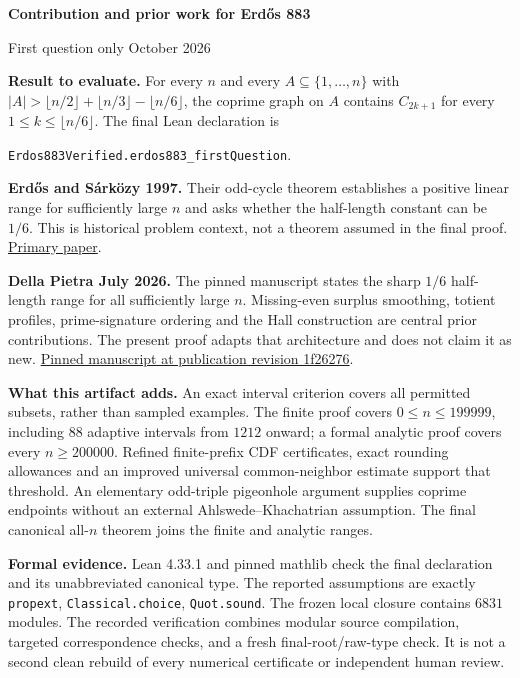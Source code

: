 \documentclass[10pt,letterpaper]{article}
\begin{document}
\begin{center}{\Large\bfseries Contribution and prior work for Erdős 883\par}\vspace{5pt}First question only October 2026\end{center}
\textbf{Result to evaluate.} For every $n$ and every $A\subseteq\{1,\ldots,n\}$ with $|A|>\lfloor n/2\rfloor+\lfloor n/3\rfloor-\lfloor n/6\rfloor$, the coprime graph on $A$ contains $C_{2k+1}$ for every $1\le k\le\lfloor n/6\rfloor$. The final Lean declaration is\par
\texttt{Erdos883Verified.erdos883\_firstQuestion}.

\textbf{Erdős and Sárközy 1997.} Their odd-cycle theorem establishes a positive linear range for sufficiently large $n$ and asks whether the half-length constant can be $1/6$. This is historical problem context, not a theorem assumed in the final proof. \href{https://emis.de/ft/6615}{Primary paper}.

\textbf{Della Pietra July 2026.} The pinned manuscript states the sharp $1/6$ half-length range for all sufficiently large $n$. Missing-even surplus smoothing, totient profiles, prime-signature ordering and the Hall construction are central prior contributions. The present proof adapts that architecture and does not claim it as new. \href{https://github.com/donalddellapietra/erdos-883-proof/blob/1f26276d7850fc9afe68e9d7edecf24aa7cc597d/paper/main.tex}{Pinned manuscript at publication revision 1f26276}.

\textbf{What this artifact adds.} An exact interval criterion covers all permitted subsets, rather than sampled examples. The finite proof covers $0\le n\le199999$, including $88$ adaptive intervals from $1212$ onward; a formal analytic proof covers every $n\ge200000$. Refined finite-prefix CDF certificates, exact rounding allowances and an improved universal common-neighbor estimate support that threshold. An elementary odd-triple pigeonhole argument supplies coprime endpoints without an external Ahlswede--Khachatrian assumption. The final canonical all-$n$ theorem joins the finite and analytic ranges.

\textbf{Formal evidence.} Lean 4.33.1 and pinned mathlib check the final declaration and its unabbreviated canonical type. The reported assumptions are exactly \texttt{propext}, \texttt{Classical.choice}, \texttt{Quot.sound}. The frozen local closure contains $6831$ modules. The recorded verification combines modular source compilation, targeted correspondence checks, and a fresh final-root/raw-type check. It is not a second clean rebuild of every numerical certificate or independent human review.
\end{document}
